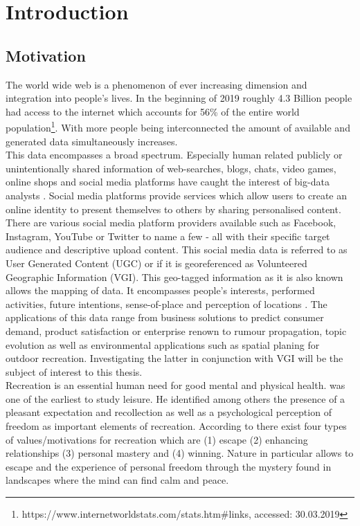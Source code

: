 \chapter{Introduction}
\section{Motivation}
The world wide web is a phenomenon of ever increasing dimension and integration into people's lives. In the beginning of 2019 roughly 4.3 Billion people had access to the internet which accounts for 56\% of the entire world population\footnote{https://www.internetworldstats.com/stats.htm\#links, accessed: 30.03.2019}. 
With more people being interconnected the amount of available and generated data simultaneously increases.\\
This data encompasses a broad spectrum. Especially human related publicly or unintentionally shared information of web-searches, blogs, chats, video games, online shops and social media platforms have caught the interest of big-data analysts \parencite{Wu2014}. Social media platforms provide services which allow users to create an online identity to present themselves to others by sharing personalised content. There are various social media platform providers available such as Facebook, Instagram, YouTube or Twitter to name a few - all with their specific target audience and descriptive upload content. This social media data is referred to as User Generated Content (UGC) or if it is georeferenced as Volunteered Geographic Information (VGI). This geo-tagged information as it is also known allows the mapping of data. It encompasses people's interests, performed activities, future intentions, sense-of-place and perception of locations \parencite{Goodchild2007}. The applications of this data range from business solutions to predict consumer demand, product satisfaction or enterprise renown \parencite{Yang2019} to rumour propagation, topic evolution \parencite{Kazienko2015} as well as environmental applications such as spatial planing for outdoor recreation. Investigating the latter in conjunction with VGI will be the subject of interest to this thesis.\\
Recreation is an essential human need for good mental \parencite{Trenberth2002} and physical health. \textcite{Kaplan1960} was one of the earliest to study leisure. He identified among others the presence of a pleasant expectation and recollection as well as a psychological perception of freedom as important elements of recreation. According to \textcite{Dillard2011} there exist four types of values/motivations for recreation which are (1) escape (2) enhancing relationships (3) personal mastery and (4) winning. Nature in particular allows to escape and the experience of personal freedom through the mystery found in landscapes \parencite{Kaplan1989} where the mind can find calm and peace. \\

